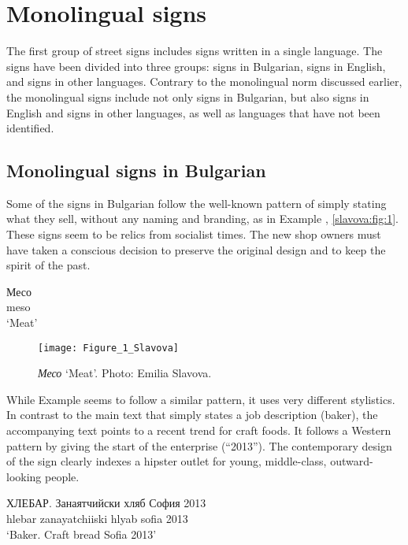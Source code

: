 \documentclass[output=paper]{langscibook}
\begin{document}
\section{Monolingual signs}\label{slavova:sec:5}
The first group of street signs includes signs written in a single language. The signs have been divided into three groups: signs in Bulgarian, signs in English, and signs in other languages. Contrary to the monolingual norm discussed earlier, the monolingual signs include not only signs in Bulgarian, but also signs in English and signs in other languages, as well as languages that have not been identified. 

\subsection{Monolingual signs in Bulgarian}
Some of the signs in Bulgarian follow the well-known pattern of simply stating what they sell, without any naming and branding, as in Example , \autoref{slavova:fig:1}. These signs seem to be relics from socialist times. The new shop owners must have taken a conscious decision to preserve the original design and to keep the spirit of the past.

\begin{exe}
  \ex\label{slavova:ex:4}
  \gll Месо \\
  meso \\
  \glt ‘Meat’
\end{exe}

\begin{figure} %
  \texttt{[image: Figure\_1\_Slavova]}
  \caption{\textit{Месо} ‘Meat’. Photo: Emilia Slavova.}
  \label{slavova:fig:1}
\end{figure}

\noindent
While Example  seems to follow a similar pattern, it uses very different stylistics. In contrast to the main text that simply states a job description (baker), the accompanying text points to a recent trend for craft foods. It follows a Western pattern by giving the start of the enterprise (“2013”). The contemporary design of the sign clearly indexes a hipster outlet for young, middle-class, outward-looking people.

\begin{exe}
  \ex\label{slavova:ex:5}
  \gll ХЛЕБАР. Занаятчийски хляб София 2013 \\
  hlebar zanayatchiiski hlyab sofia 2013 \\
  \glt ‘Baker. Craft bread Sofia 2013’
\end{exe}
\end{document}
